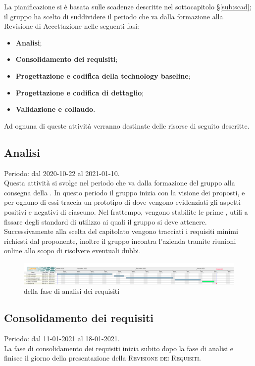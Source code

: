 \documentclass[../piano_di_progetto.tex]{subfiles}
\begin{document}
La pianificazione si è basata sulle scadenze descritte nel sottocapitolo \S\ref{sub:scad}; il gruppo ha scelto di suddividere il periodo che va dalla formazione alla Revisione di Accettazione nelle seguenti fasi:
\begin{itemize}
\item \textbf{Analisi};
\item \textbf{Consolidamento dei requisiti};
\item \textbf{Progettazione e codifica della technology baseline};
\item \textbf{Progettazione e codifica di dettaglio};
\item \textbf{Validazione e collaudo}.
\end{itemize}
Ad ognuna di queste attività verranno destinate delle risorse di seguito descritte.

\subsection{Analisi}%
\label{sub:analisi}
Periodo: dal 2020-10-22 al 2021-01-10.\\
Questa attività si svolge nel periodo che va dalla formazione del gruppo alla consegna della . In questo periodo il gruppo inizia con la visione dei  proposti, e per ognuno di essi traccia un prototipo di \textsc{} dove vengono evidenziati gli aspetti positivi e negativi di ciascuno. Nel frattempo, vengono stabilite le prime , utili a fissare degli standard di utilizzo ai quali il gruppo si deve attenere. Successivamente alla scelta del capitolato vengono tracciati i requisiti minimi richiesti dal proponente, inoltre il gruppo incontra l'azienda tramite riunioni online allo scopo di risolvere eventuali dubbi.\\

\begin{figure}[H]
\centering
\includegraphics[width=18cm]{src/img/gantt/01_RR.png}
\caption{  della fase di analisi dei requisiti}

\end{figure}


\subsection{Consolidamento dei requisiti}%
\label{sub:cons_req}
Periodo: dal 11-01-2021 al 18-01-2021.\\
La fase di consolidamento dei requisiti inizia subito dopo la fase di analisi e finisce il giorno della presentazione della \textsc{Revisione dei Requisiti}.
\end{document}
